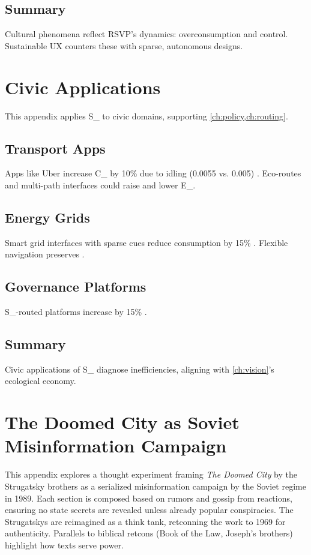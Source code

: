 \documentclass[openany]{book}
\newcommand{\Eint}{E_{\mathrm{int}}} %
\newcommand{\Cfoot}{C_{\mathrm{foot}}} %
\newcommand{\Auton}{\mathcal{A}} %
\newcommand{\SUX}{S_{\mathrm{UX}}} %
\begin{document}
\section{Summary}
Cultural phenomena reflect RSVP’s dynamics: overconsumption and control. Sustainable UX counters these with sparse, autonomous designs.

\chapter{Civic Applications}
\label{app:civic}

This appendix applies \SUX{} to civic domains, supporting \cref{ch:policy,ch:routing}.

\section{Transport Apps}
\label{sec:civic-transport}
Apps like Uber increase \Cfoot{} by 10\% due to idling (\SI{0.0055}{\kgCOe} vs. \SI{0.005}{\kgCOe}) \citep{colak2024}. Eco-routes and multi-path interfaces could raise \Auton{} and lower \Eint{}.

\section{Energy Grids}
\label{sec:civic-energy}
Smart grid interfaces with sparse cues reduce consumption by 15\% \citep{extentia2024}. Flexible navigation preserves \Auton{}.

\section{Governance Platforms}
\label{sec:civic-governance}
\SUX{}-routed platforms increase \Auton{} by 15\% \citep{doctorow2022}.

\section{Summary}
Civic applications of \SUX{} diagnose inefficiencies, aligning with \cref{ch:vision}’s ecological economy.

\chapter{The Doomed City as Soviet Misinformation Campaign}
\label{app:doomed-city}

This appendix explores a thought experiment framing \emph{The Doomed City} by the Strugatsky brothers as a serialized misinformation campaign by the Soviet regime in 1989. Each section is composed based on rumors and gossip from reactions, ensuring no state secrets are revealed unless already popular conspiracies. The Strugatskys are reimagined as a think tank, retconning the work to 1969 for authenticity. Parallels to biblical retcons (Book of the Law, Joseph's brothers) highlight how texts serve power.
\end{document}
